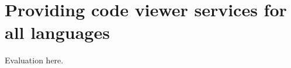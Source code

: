
\chapter{\label{chap:providing-cvs}Providing code viewer services for all languages}

Evaluation here.

